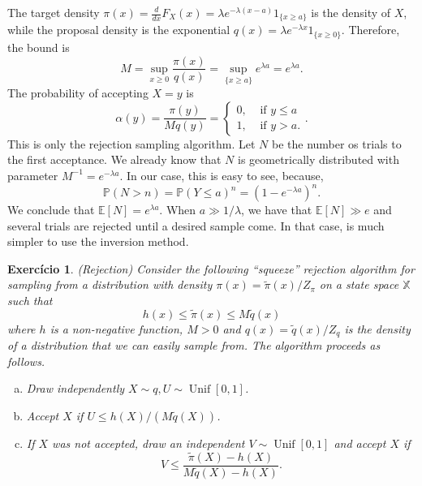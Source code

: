 \documentclass[a4paper,12pt]{article}
\newcommand{\unif}{\operatorname{Unif}}
\newcommand{\ev}{\mathbb{E}}
\newcommand{\pr}{\mathbb{P}}
\newtheorem{exercise}{Exercício}
\theoremstyle{definition}
\begin{document}
\begin{enumerate}
    The target density $\pi(x) = \frac{d}{dx}F_X(x) = \lambda
    e^{-\lambda(x-a)}1_{\{x \ge a\}}$ is the density of $X$, while the proposal density
    is the exponential $q(x) = \lambda e^{-\lambda x}1_{\{x \ge 0\}}$. Therefore, the bound
    is 
    $$
    M = \sup_{x \ge 0} \frac{\pi(x)}{q(x)} = \sup_{\{x \ge a\}} e^{\lambda a} = e^{\lambda a}. 
    $$
    The probability of accepting $X = y$ is 
    $$
    \alpha(y) = \frac{\pi(y)}{Mq(y)} = \begin{cases}
        0, &\text{ if } y \le a \\
        1, &\text{ if } y > a.
    \end{cases}.
    $$
    This is only the rejection sampling algorithm. Let $N$ be the number os
    trials to the first acceptance.  We already know that $N$ is geometrically
    distributed with parameter $M^{-1} = e^{-\lambda a}$. In our case, this is
    easy to see, because, 
    $$
    \pr(N > n) = \pr(Y \le a)^n = (1 - e^{-\lambda a})^n.
    $$
    We conclude that $\ev[N] = e^{\lambda a}$. When $a \gg 1/\lambda$, we have
    that $\ev[N] \gg e$ and several trials are rejected until a desired
    sample come. In that case, is much simpler to use the inversion method.  
\end{enumerate}

\begin{exercise}
    (Rejection)
    Consider the following ``squeeze'' rejection algorithm for sampling from a
    distribution with density $\pi(x) = \tilde{\pi}(x)/Z_{\pi}$ on a state
    space $\mathbb{X}$  such that
    $$
    h(x) \le \tilde{\pi}(x) \le M\tilde{q}(x)
    $$
    where $h$ is a non-negative function, $M > 0$ and $q(x) =
    \tilde{q}(x)/Z_q$ is the density of a distribution that we can easily
    sample from. The algorithm proceeds as follows.
    \begin{enumerate}[(a)]
        \item Draw independently $X \sim q, U \sim \unif[0,1]$.
        \item Accept $X$ if $U \le h(X)/(M\tilde{q}(X))$.
        \item If $X$ was not accepted, draw an independent $V \sim \unif[0,1]$
        and accept $X$ if 
        $$
        V \le \frac{\tilde{\pi}(X) - h(X)}{M\tilde{q}(X) - h(X)}.
        $$
    \end{enumerate}
\end{exercise}
\end{document}
